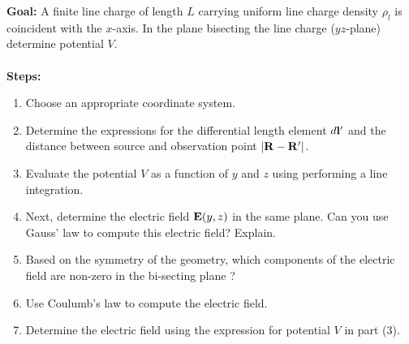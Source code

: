 \documentclass[../../header.tex]{subfiles}
\begin{document}
\textbf{Goal:} A finite line charge of length $L$ carrying uniform line charge density $\rho_l$ is coincident with the $x$-axis. In the plane bisecting the line charge ($yz$-plane) determine potential $V$.\\
\\
\textbf{Steps:} 
\begin{enumerate}
\item Choose an appropriate coordinate system.


\item Determine the expressions for the differential length element  $d\mathbf{l}'$ and the distance between source and observation point $\left|\mathbf{R} - \mathbf{R}'\right|$.


\item Evaluate the potential $V$ as a function of $y$ and $z$ using performing a line integration.


\item Next, determine the electric field $\mathbf{E}(y,z)$ in the same plane. Can you use Gauss' law to compute this electric field? Explain.


\item Based on the  symmetry of the geometry, which components of the electric field are non-zero in the bi-secting plane ? 


\item Use Coulumb's law to compute the electric field. 


\item Determine the electric field using the expression for potential $V$ in part (3).

\end{enumerate}
\end{document}
